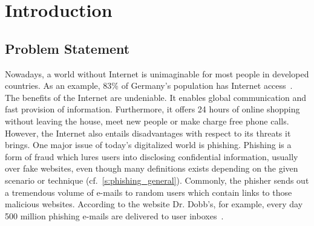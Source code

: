 \section{Introduction}
\label{s:introduction}

\subsection{Problem Statement}
Nowadays, a world without Internet is unimaginable for most people in developed countries.
As an example, 83\% of Germany's population has Internet access~\cite{globalfinance2012internetusage}. 
The benefits of the Internet are undeniable.
It enables global communication and fast provision of information.
Furthermore, it offers 24 hours of online shopping without leaving the house, meet new people or make charge free phone calls.
However, the Internet also entails disadvantages with respect to its threats it brings.
One major issue of today's digitalized world is phishing. 
Phishing is a form of fraud which lures users into disclosing confidential information, usually over fake websites, even though many definitions exists depending on the given scenario or technique (cf.~\autoref{s:phishing_general}).
Commonly, the phisher sends out a tremendous volume of e-mails to random users which contain links to those malicious websites.
According to the website Dr. Dobb's, for example, every day 500 million phishing e-mails are delivered to user inboxes~\cite{drdobb2012email}.

